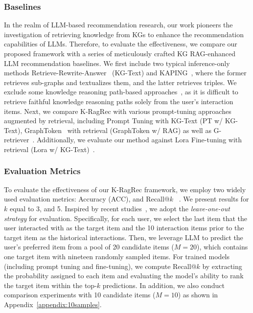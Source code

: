\subsubsection{\textbf{Baselines}}\label{baseline}

In the realm of LLM-based recommendation research, our work pioneers the investigation of retrieving knowledge from KGs to enhance the recommendation capabilities of LLMs.
Therefore, to evaluate the effectiveness, we compare our proposed framework with a series of meticulously crafted KG RAG-enhanced LLM recommendation baselines.
We first include two typical inference-only methods Retrieve-Rewrite-Answer~\citep{wu2023retrieve} (KG-Text) and KAPING~\citep{baek2023knowledge}, where the former retrieves sub-graphs and textualizes them, and the latter retrieves triples.
We exclude some knowledge reasoning path-based approaches~\citep{luo2023reasoning}, as it is difficult to retrieve faithful knowledge reasoning paths solely from the user's interaction items.
Next, we compare K-RagRec with various prompt-tuning approaches augmented by retrieval, including Prompt Tuning with KG-Text (PT w/ KG-Text), GraphToken~\citep{perozzi2024let} with retrieval (GraphToken w/ RAG) as well as G-retriever~\citep{he2024g}. Additionally, we evaluate our method against Lora Fine-tuning with retrieval (Lora w/ KG-Text)~\citep{hu2021lora}.



\subsubsection{\textbf{Evaluation Metrics}}
To evaluate the effectiveness of our K-RagRec framework, we employ two widely used evaluation metrics: Accuracy (ACC), and Recall@$k$ ~\citep{he2020lightgcn}. We present results for $k$ equal to 3, and 5. Inspired by recent studies~\citep{zhang2024agentcf,hou2022towards}, we adopt the \textit{leave-one-out strategy} for
evaluation. Specifically, for each user, we select the last item that the user interacted with as the target item and the 10 interaction items prior to the target item as the historical interactions. Then, we leverage LLM to predict the user's preferred item from a pool of 20 candidate items ($M = 20$), which contains one target item with nineteen randomly sampled items. For trained models (including prompt tuning and fine-tuning), we compute Recall@$k$ by extracting the probability assigned to each item and evaluating the model's ability to rank the target item within the top-$k$ predictions. In addition, we also conduct comparison experiments with 10 candidate items ($M = 10$) as shown in Appendix~\ref{appendix:10samples}.




